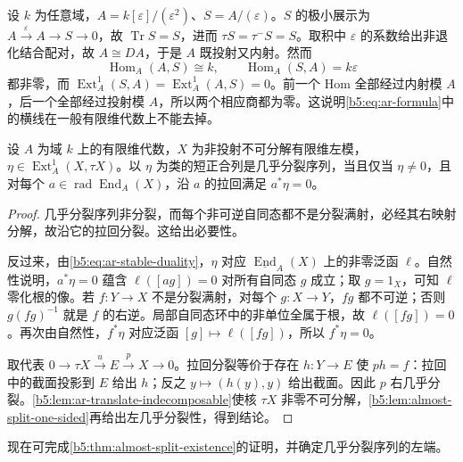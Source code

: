 \begin{example}\label{b5:exm:ar-quotient-needed}
	设 \(k\) 为任意域，\(A=k[\varepsilon]/(\varepsilon^2)\)、\(S=A/(\varepsilon)\)。\(S\) 的极小展示为 \(A\xrightarrow{\varepsilon}A\to S\to0\)，故 \(\operatorname{Tr}S=S\)，进而 \(\tau S=\tau^-S=S\)。取积中 \(\varepsilon\) 的系数给出非退化结合配对，故 \(A\cong DA\)，于是 \(A\) 既投射又内射。然而
	\[
		\operatorname{Hom}_A(A,S)\cong k,
		\qquad\operatorname{Hom}_A(S,A)=k\varepsilon
	\]
	都非零，而 \(\operatorname{Ext}_A^1(S,A)=\operatorname{Ext}_A^1(A,S)=0\)。前一个 Hom 全部经过内射模 \(A\)，后一个全部经过投射模 \(A\)，所以两个相应商都为零。这说明\eqref{b5:eq:ar-formula}中的横线在一般有限维代数上不能去掉。
\end{example}

\begin{proposition}\label{b5:prop:ar-socle-extension}
	设 \(A\) 为域 \(k\) 上的有限维代数，\(X\) 为非投射不可分解有限维左模，\(\eta\in\operatorname{Ext}_A^1(X,\tau X)\)。以 \(\eta\) 为类的短正合列是几乎分裂序列，当且仅当 \(\eta\ne0\)，且对每个 \(a\in\operatorname{rad}\operatorname{End}_A(X)\)，沿 \(a\) 的拉回满足 \(a^*\eta=0\)。
\end{proposition}
\begin{proof}
	几乎分裂序列非分裂，而每个非可逆自同态都不是分裂满射，必经其右映射分解，故沿它的拉回分裂。这给出必要性。

	反过来，由\eqref{b5:eq:ar-stable-duality}，\(\eta\) 对应 \(\underline{\operatorname{End}}_A(X)\) 上的非零泛函 \(\ell\)。自然性说明，\(a^*\eta=0\) 蕴含 \(\ell([ag])=0\) 对所有自同态 \(g\) 成立；取 \(g=1_X\)，可知 \(\ell\) 零化根的像。若 \(f:Y\to X\) 不是分裂满射，对每个 \(g:X\to Y\)，\(fg\) 都不可逆；否则 \(g(fg)^{-1}\) 就是 \(f\) 的右逆。局部自同态环中的非单位全属于根，故 \(\ell([fg])=0\)。再次由自然性，\(f^*\eta\) 对应泛函 \([g]\mapsto\ell([fg])\)，所以 \(f^*\eta=0\)。

	取代表 \(0\to\tau X\xrightarrow{u}E\xrightarrow{p}X\to0\)。拉回分裂等价于存在 \(h:Y\to E\) 使 \(ph=f\)：拉回中的截面投影到 \(E\) 给出 \(h\)；反之 \(y\mapsto(h(y),y)\) 给出截面。因此 \(p\) 右几乎分裂。\cref{b5:lem:ar-translate-indecomposable}使核 \(\tau X\) 非零不可分解，\cref{b5:lem:almost-split-one-sided}再给出左几乎分裂性，得到结论。
\end{proof}

现在可完成\cref{b5:thm:almost-split-existence}的证明，并确定几乎分裂序列的左端。

